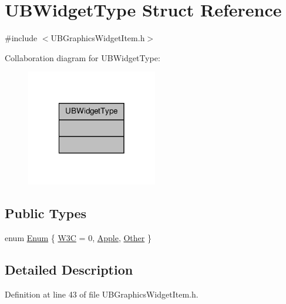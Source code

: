 \hypertarget{struct_u_b_widget_type}{\section{U\-B\-Widget\-Type Struct Reference}
\label{d2/d1d/struct_u_b_widget_type}
}


{\ttfamily \#include $<$U\-B\-Graphics\-Widget\-Item.\-h$>$}



Collaboration diagram for U\-B\-Widget\-Type\-:
\nopagebreak
\begin{figure}[H]
\begin{center}
\leavevmode
\includegraphics[width=162pt]{d7/d59/struct_u_b_widget_type__coll__graph}
\end{center}
\end{figure}
\subsection*{Public Types}
\begin{DoxyCompactItemize}
\item 
enum \hyperlink{struct_u_b_widget_type_a6a90818ab404c532c73507cec439f9c2}{Enum} \{ \hyperlink{struct_u_b_widget_type_a6a90818ab404c532c73507cec439f9c2ab40a9707b6da2b4dd278425834c6e1e6}{W3\-C} =  0, 
\hyperlink{struct_u_b_widget_type_a6a90818ab404c532c73507cec439f9c2aa6bf07ae683b31dc60d88650c53e3494}{Apple}, 
\hyperlink{struct_u_b_widget_type_a6a90818ab404c532c73507cec439f9c2a8a0d41f0852086ed9d7d364b8da35160}{Other}
 \}
\end{DoxyCompactItemize}


\subsection{Detailed Description}


Definition at line 43 of file U\-B\-Graphics\-Widget\-Item.\-h.



